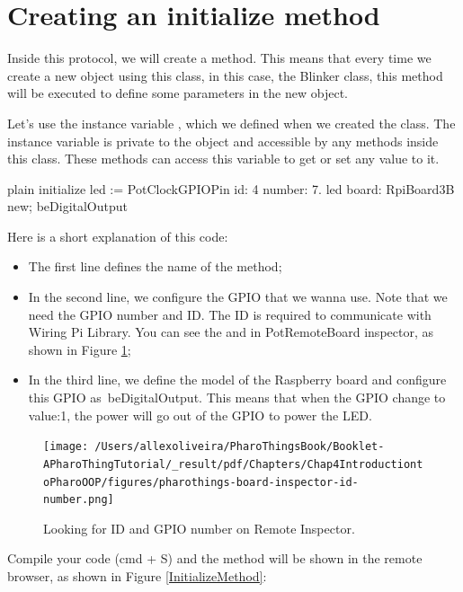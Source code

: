 \documentclass[10pt,twoside,english]{_support/latex/sbabook/sbabook}
\begin{document}
\section{Creating an initialize method}
Inside this protocol, we will create a  method. This means that every time we create a new object using this class, in this case, the Blinker class, this method will be executed to define some parameters in the new object.

Let's use the instance variable , which we defined when we created the class. The instance variable is private to the object and accessible by any methods inside this class. These methods can access this variable to get or set any value to it.

\begin{displaycode}{plain}
initialize 
  led := PotClockGPIOPin id: 4 number: 7. 
  led board: RpiBoard3B new; beDigitalOutput
\end{displaycode}

Here is a short explanation of this code:

\begin{itemize}
\item The first line defines the name of the method;
\item In the second line, we configure the GPIO that we wanna use. Note that we need the GPIO number and ID. The ID is required to communicate with Wiring Pi Library. You can see the  and  in PotRemoteBoard inspector, as shown in Figure \ref{RemoteInspector};
\item In the third line, we define the model of the Raspberry board and configure this GPIO as beDigitalOutput. This means that when the GPIO change to value:1, the power will go out of the GPIO to power the LED.
\end{itemize}


\begin{figure}

\begin{center}
\texttt{[image: /Users/allexoliveira/PharoThingsBook/Booklet-APharoThingTutorial/\_result/pdf/Chapters/Chap4IntroductiontoPharoOOP/figures/pharothings-board-inspector-id-number.png]}\caption{Looking for ID and GPIO number on Remote Inspector.\label{RemoteInspector}}\end{center}
\end{figure}


Compile your code (cmd + S) and the method will be shown in the remote browser, as shown in Figure \ref{InitializeMethod}:
\end{document}
